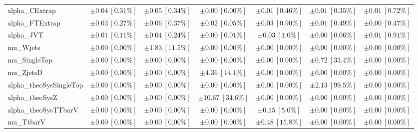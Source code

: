 \begin{sidewaystable}
\begin{center}
\begin{tabular*}{\textwidth}{@{\extracolsep{\fill}}lcccccc}
alpha\_CExtrap         & $\pm 0.04\ [0.31\%] $          & $\pm 0.05\ [0.34\%] $          & $\pm 0.00\ [0.00\%] $          & $\pm 0.01\ [0.46\%] $          & $\pm 0.01\ [0.35\%] $          & $\pm 0.01\ [0.72\%] $       \\
alpha\_FTExtrap         & $\pm 0.03\ [0.27\%] $          & $\pm 0.06\ [0.37\%] $          & $\pm 0.02\ [0.05\%] $          & $\pm 0.03\ [0.90\%] $          & $\pm 0.01\ [0.49\%] $          & $\pm 0.00\ [0.47\%] $       \\
alpha\_JVT         & $\pm 0.01\ [0.11\%] $          & $\pm 0.04\ [0.24\%] $          & $\pm 0.00\ [0.01\%] $          & $\pm 0.03\ [1.0\%] $          & $\pm 0.00\ [0.06\%] $          & $\pm 0.01\ [0.91\%] $       \\
mu\_Wjets         & $\pm 0.00\ [0.00\%] $          & $\pm 1.83\ [11.5\%] $          & $\pm 0.00\ [0.00\%] $          & $\pm 0.00\ [0.00\%] $          & $\pm 0.00\ [0.00\%] $          & $\pm 0.00\ [0.00\%] $       \\
mu\_SingleTop         & $\pm 0.00\ [0.00\%] $          & $\pm 0.00\ [0.00\%] $          & $\pm 0.00\ [0.00\%] $          & $\pm 0.00\ [0.00\%] $          & $\pm 0.72\ [33.4\%] $          & $\pm 0.00\ [0.00\%] $       \\
mu\_ZjetsD         & $\pm 0.00\ [0.00\%] $          & $\pm 0.00\ [0.00\%] $          & $\pm 4.36\ [14.1\%] $          & $\pm 0.00\ [0.00\%] $          & $\pm 0.00\ [0.00\%] $          & $\pm 0.00\ [0.00\%] $       \\
alpha\_theoSysSingleTop         & $\pm 0.00\ [0.00\%] $          & $\pm 0.00\ [0.00\%] $          & $\pm 0.00\ [0.00\%] $          & $\pm 0.00\ [0.00\%] $          & $\pm 2.13\ [99.5\%] $          & $\pm 0.00\ [0.00\%] $       \\
alpha\_theoSysZ         & $\pm 0.00\ [0.00\%] $          & $\pm 0.00\ [0.00\%] $          & $\pm 10.67\ [34.6\%] $          & $\pm 0.00\ [0.00\%] $          & $\pm 0.00\ [0.00\%] $          & $\pm 0.00\ [0.00\%] $       \\
alpha\_theoSysTTbarV         & $\pm 0.00\ [0.00\%] $          & $\pm 0.00\ [0.00\%] $          & $\pm 0.00\ [0.00\%] $          & $\pm 0.15\ [5.0\%] $          & $\pm 0.00\ [0.00\%] $          & $\pm 0.00\ [0.00\%] $       \\
mu\_TtbarV         & $\pm 0.00\ [0.00\%] $          & $\pm 0.00\ [0.00\%] $          & $\pm 0.00\ [0.00\%] $          & $\pm 0.48\ [15.8\%] $          & $\pm 0.00\ [0.00\%] $          & $\pm 0.00\ [0.00\%] $       \\

\end{tabular*}
\end{center}
\end{sidewaystable}
